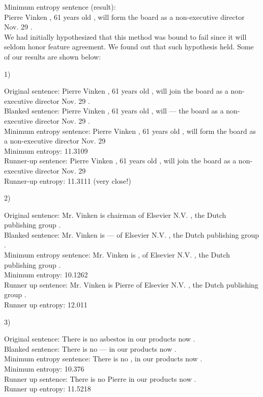 \documentclass{article}[12pt]
\theoremstyle{definition}
\begin{document}
Minimum entropy sentence (result): \\ 
Pierre Vinken , 61 years old , will form the board as a non-executive director Nov. 29 .\\

We had initially hypothesized that this method was bound to fail since it will seldom honor feature agreement. We found out that such hypothesis held. Some of our results are shown below: \\


\begin{flushleft}
1)
\end{flushleft} 
Original sentence: Pierre Vinken , 61 years old , will join the board as a non-executive director Nov. 29 . \\
Blanked sentence: Pierre Vinken , 61 years old , will --- the board as a non-executive director Nov. 29 . \\
Minimum entropy sentence: Pierre Vinken , 61 years old , will form the board as a non-executive director Nov. 29 \\
Minimum entropy: 11.3109 \\
Runner-up sentence: Pierre Vinken , 61 years old , will join the board as a non-executive director Nov. 29 \\
Runner-up entropy: 11.3111 (very close!) \\

\begin{flushleft}
2)
\end{flushleft}
Original sentence: Mr. Vinken is chairman of Elsevier N.V. , the Dutch publishing group . \\
Blanked sentence: Mr. Vinken is --- of Elsevier N.V. , the Dutch publishing group . \\
Minimum entropy sentence: Mr. Vinken is , of Elsevier N.V. , the Dutch publishing group .\\
Minimum entropy: 10.1262\\
Runner up sentence: Mr. Vinken is Pierre of Elsevier N.V. , the Dutch publishing group .\\
Runner up entropy: 12.011\\

\begin{flushleft}
3)
\end{flushleft}
Original sentence: There is no asbestos in our products now .\\
Blanked sentence: There is no --- in our products now .\\
Minimum entropy sentence: There is no , in our products now .\\
Minimum entropy: 10.376\\
Runner up sentence: There is no Pierre in our products now .\\
Runner up entropy: 11.5218\\
\end{document}

